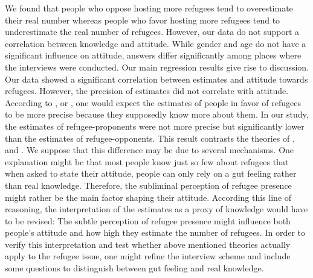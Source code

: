 \documentclass{article}
\begin{document}
We found that people who oppose hosting more refugees tend to overestimate their real number whereas people who favor hosting more refugees tend to underestimate the real number of refugees.
However, our data do not support a correlation between knowledge and attitude.
While gender and age do not have a significant influence on attitude, answers differ significantly among places where the interviews were conducted.
Our main regression results give rise to discussion. Our data showed a significant correlation between estimates and attitude towards refugees. However, the precision of estimates did not correlate with attitude. According to \cite{Pettigrew1997}, \cite{Pettigrew1998} or \cite{Rydgren2004}, one would expect the estimates of people in favor of refugees to be more precise because they supposedly know more about them. In our study, the estimates of refugee-proponents were not more precise but significantly lower than the estimates of refugee-opponents. This result contrasts the theories of \cite{Pettigrew1997}, \cite{Pettigrew1998} and \cite{Rydgren2004}. We suppose that this difference may be due to several mechanisms. One explanation might be that most people know just so few about refugees that when asked to state their attitude, people can only rely on a gut feeling rather than real knowledge. Therefore, the subliminal perception of refugee presence might rather be the main factor shaping their attitude. According this line of reasoning, the interpretation of the estimates as a proxy of knowledge would have to be revised: The subtle perception of refugee presence might influence both people's attitude and how high they estimate the number of refugees.
In order to verify this interpretation and test whether above mentioned theories actually apply to the refugee issue, one might refine the interview scheme and include some questions to distinguish between gut feeling and real knowledge.
\end{document}
